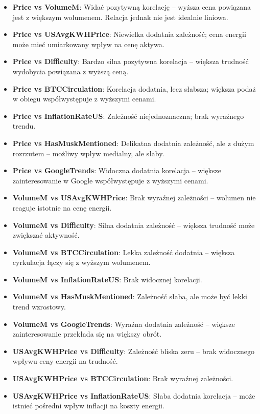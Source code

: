 \documentclass[
  11pt,
]{article}
\begin{document}
\begin{itemize}
\item
  \textbf{Price vs VolumeM}: Widać pozytywną korelację -- wyższa cena
  powiązana jest z większym wolumenem. Relacja jednak nie jest idealnie
  liniowa.
\item
  \textbf{Price vs USAvgKWHPrice}: Niewielka dodatnia zależność; cena
  energii może mieć umiarkowany wpływ na cenę aktywa.
\item
  \textbf{Price vs Difficulty}: Bardzo silna pozytywna korelacja --
  większa trudność wydobycia powiązana z wyższą ceną.
\item
  \textbf{Price vs BTCCirculation}: Korelacja dodatnia, lecz słabsza;
  większa podaż w obiegu współwystępuje z wyższymi cenami.
\item
  \textbf{Price vs InflationRateUS}: Zależność niejednoznaczna; brak
  wyraźnego trendu.
\item
  \textbf{Price vs HasMuskMentioned}: Delikatna dodatnia zależność, ale
  z dużym rozrzutem -- możliwy wpływ medialny, ale słaby.
\item
  \textbf{Price vs GoogleTrends}: Widoczna dodatnia korelacja -- większe
  zainteresowanie w Google współwystępuje z wyższymi cenami.
\item
  \textbf{VolumeM vs USAvgKWHPrice}: Brak wyraźnej zależności -- wolumen
  nie reaguje istotnie na cenę energii.
\item
  \textbf{VolumeM vs Difficulty}: Silna dodatnia zależność -- większa
  trudność może zwiększać aktywność.
\item
  \textbf{VolumeM vs BTCCirculation}: Lekka zależność dodatnia --
  większa cyrkulacja łączy się z wyższym wolumenem.
\item
  \textbf{VolumeM vs InflationRateUS}: Brak widocznej korelacji.
\item
  \textbf{VolumeM vs HasMuskMentioned}: Zależność słaba, ale może być
  lekki trend wzrostowy.
\item
  \textbf{VolumeM vs GoogleTrends}: Wyraźna dodatnia zależność --
  większe zainteresowanie przekłada się na większy obrót.
\item
  \textbf{USAvgKWHPrice vs Difficulty}: Zależność bliska zeru -- brak
  widocznego wpływu ceny energii na trudność.
\item
  \textbf{USAvgKWHPrice vs BTCCirculation}: Brak wyraźnej zależności.
\item
  \textbf{USAvgKWHPrice vs InflationRateUS}: Słaba dodatnia korelacja --
  może istnieć pośredni wpływ inflacji na koszty energii.

\end{itemize}
\end{document}
